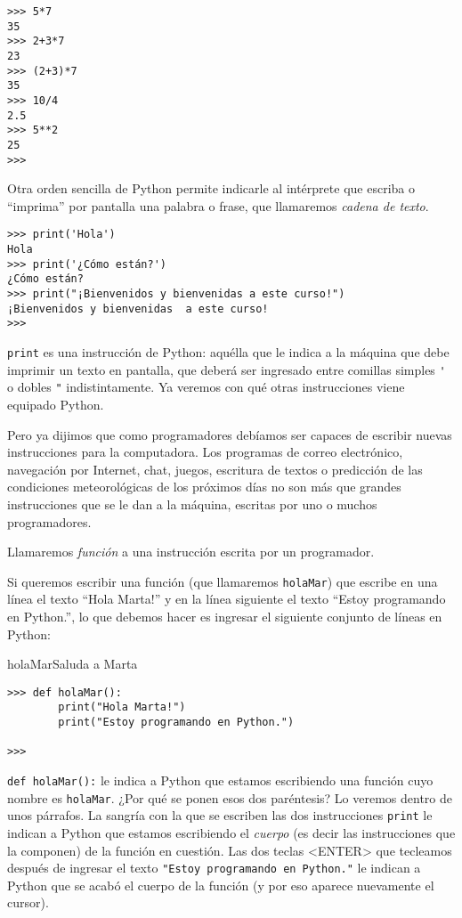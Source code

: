 \begin{lstlisting}[numbers=none]
>>> 5*7
35
>>> 2+3*7
23
>>> (2+3)*7
35
>>> 10/4
2.5
>>> 5**2
25
>>>
\end{lstlisting}

Otra orden sencilla de Python permite indicarle al intérprete que escriba o
``imprima'' por pantalla una palabra o frase, que llamaremos {\it cadena de
texto}.

\begin{lstlisting}[numbers=none]
>>> print('Hola')
Hola
>>> print('¿Cómo están?')
¿Cómo están?
>>> print("¡Bienvenidos y bienvenidas a este curso!")
¡Bienvenidos y bienvenidas  a este curso!
>>>
\end{lstlisting}

\lstinline+print+ es una instrucción de Python: aquélla que le indica a la
máquina que debe imprimir un texto en pantalla, que deberá ser ingresado entre
comillas simples \lstinline!'! o dobles \lstinline!"! indistintamente. Ya
veremos con qué otras instrucciones viene equipado Python.

Pero ya dijimos que como programadores debíamos ser capaces de
escribir nuevas instrucciones para la computadora. Los programas
de correo electrónico, navegación por Internet, chat, juegos,
escritura de textos o predicción de las condiciones meteorológicas de los
próximos días no son más que grandes instrucciones que se le dan a la
máquina, escritas por uno o muchos programadores.

Llamaremos {\it función} a una instrucción escrita por un
programador.

Si queremos escribir una función (que llamaremos \lstinline!holaMar!)
que escribe en una línea el texto ``Hola Marta!'' y en la línea
siguiente el texto ``Estoy programando en Python.'', lo que
debemos hacer es ingresar el siguiente conjunto de líneas en
Python:

\begin{codigo}{holaMar}{Saluda a Marta}
\begin{lstlisting}[numbers=none]
>>> def holaMar():
        print("Hola Marta!")
        print("Estoy programando en Python.")

>>>
\end{lstlisting}
\end{codigo}

\lstinline!def holaMar():! le indica a Python que estamos escribiendo
una función cuyo nombre es \lstinline!holaMar!. ¿Por qué se ponen
esos dos paréntesis? Lo veremos dentro de unos párrafos. La
sangría con la que se escriben las dos instrucciones \lstinline+print+
le indican a Python que estamos escribiendo el {\it cuerpo} (es
decir las instrucciones que la componen) de la función en
cuestión. Las dos teclas <ENTER> \esp que tecleamos después de
ingresar el texto \lstinline+"Estoy programando en Python."+ le indican
a Python que se acabó el cuerpo de la función (y por eso aparece
nuevamente el cursor).

